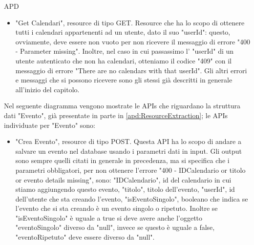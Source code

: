 \begin{listaPersonale} {APD}
\begin{listaPersonale2}[APD]{}
\begin{listaPersonale3}[APD]{}
\begin{itemize}
\begin{itemize}
                      \end{itemize}
                      Infine, l'errore "409" si potrebbe ottenere anche quando l' "userId" dell'utente, che sta creando il calendario, è un duplicato o non esiste nel database. Si ottiene come messaggio di errore: "There are too many users with that userId" o "There is no user with that userId" rispettivamente.
                \item "Get Calendari", resource di tipo GET. Resource che ha lo scopo di ottenere tutti i calendari appartenenti ad un utente, dato il suo "userId": questo, ovviamente, deve essere non vuoto per non ricevere il messaggio di errore "400 - Parameter missing". Inoltre, nel caso in cui passassimo l' "userId" di un utente autenticato che non ha calendari, otteniamo il codice "409" con il messaggio di errore "There are no calendars with that userId". Gli altri errori e messaggi che si possono ricevere sono gli stessi già descritti in generale all'inizio del capitolo.
            \end{itemize}
            \begin{center}
                
            \end{center}
            Nel seguente diagramma vengono mostrate le APIs che riguardano la struttura dati "Evento", già presentate in parte in \ref{apd:ResourceExtraction}; le APIs individuate per "Evento" sono:
            \begin{itemize}
                \item "Crea Evento", resource di tipo POST. Questa API ha lo scopo di andare a salvare un evento nel database usando i parametri dati in input. Gli output sono sempre quelli citati in generale in precedenza, ma si specifica che i parametri obbligatori, per non ottenere l'errore "400 - IDCalendario or titolo or evento details missing", sono: "IDCalendario", id del calendario in cui stiamo aggiungendo questo evento, "titolo", titolo dell'evento, "userId", id dell'utente che sta creando l'evento, "isEventoSingolo", booleano che indica se l'evento che si sta creando è un evento singolo o ripetuto. Inoltre se "isEventoSingolo" è uguale a true si deve avere anche l'oggetto "eventoSingolo" diverso da "null", invece se questo è uguale a false, "eventoRipetuto" deve essere diverso da "null".

\end{itemize}
\end{listaPersonale3}
\end{listaPersonale2}
\end{listaPersonale}
